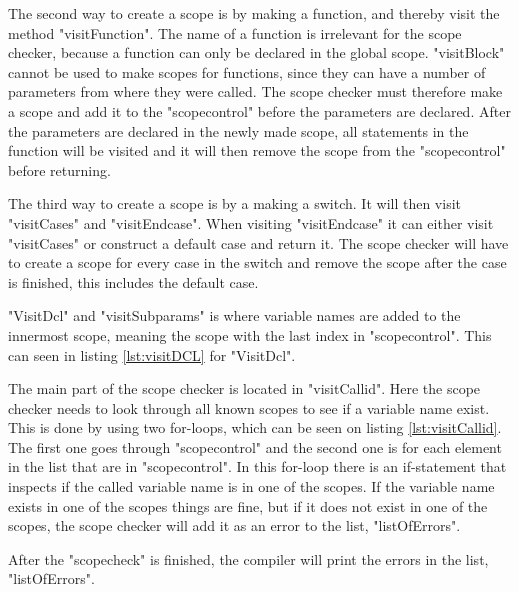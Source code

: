 
The second way to create a scope is by making a function, and thereby visit the method "visitFunction". The name of a function is irrelevant for the scope checker, because a function can only be declared in the global scope. "visitBlock" cannot be used to make scopes for functions, since they can have a number of parameters from where they were called. The scope checker must therefore make a scope and add it to the "scopecontrol" before the parameters are declared. After the parameters are declared in the newly made scope, all statements in the function will be visited and it will then remove the scope from the "scopecontrol" before returning.

The third way to create a scope is by a making a switch. It will then visit "visitCases" and "visitEndcase". When visiting "visitEndcase" it can either visit "visitCases" or construct a default case and return it. The scope checker will have to create a scope for every case in the switch and remove the scope after the case is finished, this includes the default case.

"VisitDcl" and "visitSubparams" is where variable names are added to the innermost scope, meaning the scope with the last index in "scopecontrol". This can seen in listing \ref{lst:visitDCL} for "VisitDcl".


The main part of the scope checker is located in "visitCallid". Here the scope checker needs to look through all known scopes to see if a variable name exist. This is done by using two for-loops, which can be seen on listing \ref{lst:visitCallid}. The first one goes through "scopecontrol" and the second one is for each element in the list that are in "scopecontrol". In this for-loop there is an if-statement that inspects if the called variable name is in one of the scopes. If the variable name exists in one of the scopes things are fine, but if it does not exist in one of the scopes, the scope checker will add it as an error to the list, "listOfErrors".


After the "scopecheck" is finished, the compiler will print the errors in the list, "listOfErrors".
